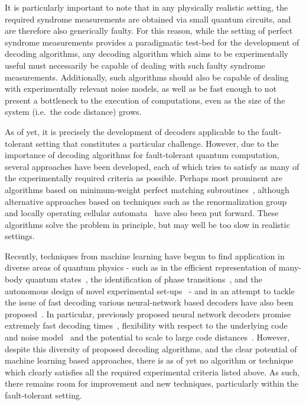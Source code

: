 \documentclass[twocolumn,preprintnumbers,amsmath,amssymb,notitlepage,nofootinbib,longbibliography,superscriptaddress,aps,pra,10pt]{revtex4-1}
\begin{document}
	It is particularly important to note that in any physically realistic setting, the required syndrome measurements are obtained via small quantum circuits, and are therefore also generically faulty.
	For this reason, while the setting of perfect syndrome measurements provides a paradigmatic test-bed for the development of decoding algorithms, any decoding algorithm which aims to be experimentally useful 
	must necessarily be capable of dealing with such faulty syndrome measurements.
	Additionally, such algorithms should also be capable of dealing with experimentally relevant noise models, as well as be fast enough to not present a bottleneck to the execution of computations, even as the size of the system (i.e.\ the code distance) 
	grows.

	As of yet, it is precisely the development of decoders applicable to the fault-tolerant setting that constitutes a particular challenge.
	However, due to the importance of decoding algorithms for fault-tolerant quantum computation, several approaches have been developed, each of which tries to satisfy as many of the experimentally required criteria as possible.
	Perhaps most prominent are algorithms based on minimum-weight perfect matching subroutines~\cite{Fowler13}, although alternative approaches based on techniques such as the renormalization group~\cite{Duclos2010} and locally operating cellular automata~\cite{Herold15,herold2017cellular,Kubica2018} have also been put forward.
	These algorithms solve the problem in principle, but may well be too slow in realistic settings.

	Recently, techniques from machine learning have begun to find application in diverse areas of quantum physics - such as in the efficient representation of many-body quantum states~\cite{WFcarleo2017solving,WFcarleo2018constructing,WFgao2017efficient}, the identification of phase transitions~\cite{PTvan2017learning,PTPhysRevB.97.134109,PTcarrasquilla2017machine}, and the autonomous design of novel experimental set-ups~\cite{melnikov2018active,fosel2018reinforcement} - and in an attempt to tackle the issue of fast decoding various neural-network based decoders have also been proposed~\cite{Torlai10, Varsamopoulos17, Krastanov17, chamberland2018deep, Baireuther18a, Baireuther18b, Breuckmann18,Ni18}.
	In particular, previously proposed neural network decoders promise extremely fast decoding times~\cite{chamberland2018deep}, flexibility with respect to the underlying code and noise model~\cite{chamberland2018deep,Baireuther18a,Baireuther18b,Breuckmann18} and the potential to scale to large code distances~\cite{Ni18, Breuckmann18}.
	However, despite this diversity of proposed decoding algorithms, and the clear potential of machine learning based approaches, there is as of yet no algorithm or technique which clearly satisfies all the required experimental criteria listed above.
	As such, there remains room for improvement and new techniques, particularly within the fault-tolerant setting.
\end{document}
